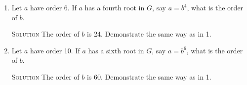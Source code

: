 \documentclass[twoside]{amsart}
\newcommand{\solution}{\textsc{Solution}\xspace}
\newcommand{\blank}{\vspace{5pt}}
\newcommand{\itm}{\blank\item}
\newcommand{\sol}{\blank\noindent\solution}
\begin{document}
\begin{enumerate}[A.]
\begin{enumerate}[1)]
      \itm Let $a$ have order 6. If $a$ has a fourth root in $G$, say $a = 
      b^4$, what is the order of $b$.

      \sol The order of $b$ is 24. Demonstrate the same way as in 1.

      \itm Let $a$ have order 10. If $a$ has a sixth root in $G$, say $a = 
      b^6$, what is the order of $b$.

      \sol The order of $b$ is 60. Demonstrate the same way as in 1.
      
         

   \end{enumerate}


\end{enumerate}
\end{document}
